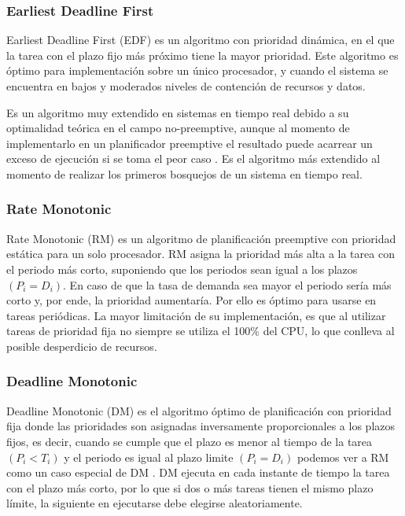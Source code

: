     \subsubsection{Earliest Deadline First} 
    Earliest Deadline First (EDF) es un algoritmo con prioridad dinámica, en el que la tarea con el plazo fijo más próximo tiene la mayor prioridad. Este algoritmo es óptimo para implementación sobre un único procesador, y cuando el sistema se encuentra en bajos y moderados niveles de contención de recursos y datos\cite{Liu}.
\newline
     
    Es un algoritmo muy extendido en sistemas en tiempo real debido a su optimalidad teórica en el campo no-preemptive, aunque al momento de implementarlo en un planificador preemptive el resultado puede acarrear un exceso de ejecución si se toma el peor caso \cite{EmbSysDes}. Es el algoritmo más extendido al momento de realizar los primeros bosquejos de un sistema en tiempo real.
    
     \subsubsection{Rate Monotonic}
    Rate Monotonic (RM) es un algoritmo de planificación preemptive con prioridad estática para un solo procesador\cite{Liu}. RM asigna la prioridad más alta a la tarea con el periodo más corto, suponiendo que los periodos sean igual a los plazos \( (P_{i} = D_{i}) \). En caso de que la tasa de demanda sea mayor el periodo sería más corto y, por ende, la prioridad aumentaría. Por ello es óptimo para usarse en tareas periódicas. La mayor limitación de su implementación, es que al utilizar tareas de prioridad fija no siempre se utiliza el 100\%  del CPU, lo que conlleva al posible desperdicio de recursos\cite{RM}.

\subsubsection{Deadline Monotonic}
Deadline Monotonic (DM) es el algoritmo óptimo de planificación con prioridad fija donde las prioridades son asignadas inversamente proporcionales a los plazos fijos, es decir, cuando se cumple que el plazo es menor al tiempo de la tarea \( (P_{i} < T_{i}) \) y el periodo es igual al plazo limite \( (P_{i} = D_{i}) \) podemos ver a RM como un caso especial de DM \cite{NPr}. DM ejecuta en cada instante de tiempo la tarea con el plazo más corto, por lo que si dos o más tareas tienen el mismo plazo límite, la siguiente en ejecutarse debe elegirse aleatoriamente.

